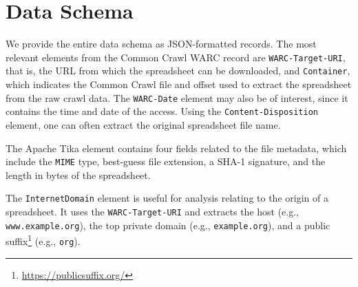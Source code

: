 \documentclass[conference]{IEEEtran}
\begin{document}





\section{Data Schema}
\label{sec:schema}


We provide the entire data schema as JSON-formatted records. The most relevant elements from the Common Crawl WARC record are \texttt{WARC-Target-URI}, that is, the URL from which the spreadsheet can be downloaded, and \texttt{Container}, which indicates the Common Crawl file and offset used to extract the spreadsheet from the raw crawl data. The \texttt{WARC-Date} element may also be of interest, since it contains the time and date of the access. Using the \texttt{Content-Disposition} element, one can often extract the original spreadsheet file name.

The Apache Tika element contains four fields related to the file metadata, which include the \texttt{MIME} type, best-guess file extension, a SHA-1 signature, and the length in bytes of the spreadsheet.


The \texttt{InternetDomain} element is useful for analysis relating to the origin of a spreadsheet. It uses the \texttt{WARC-Target-URI} and extracts the host (e.g., \texttt{www.example.org}), the top private domain (e.g., \texttt{example.org}), and a public suffix\footnote{\url{https://publicsuffix.org/}} (e.g., \texttt{org}).

\end{document}
